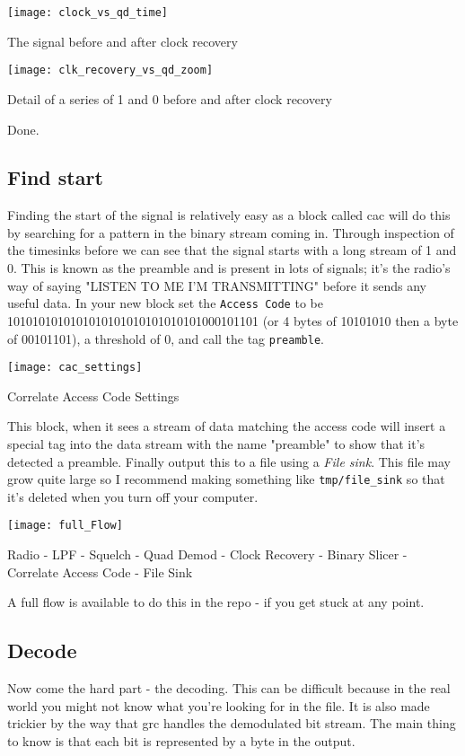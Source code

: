 \centrefigurestart
\texttt{[image: clock\_vs\_qd\_time]}
\caption{The signal before and after clock recovery}
\label{binslice}
\centrefigureend

\centrefigurestart
\texttt{[image: clk\_recovery\_vs\_qd\_zoom]}
\caption{Detail of a series of 1 and 0 before and after clock recovery}
\label{bindetail}
\centrefigureend


Done.

\subsection{Find start}
Finding the start of the signal is relatively easy as a block called \Gls{cac} will do this by searching for a pattern in the binary stream coming in. Through inspection of the \gls{timesink}s before we can see that the signal starts with a long stream of 1 and 0. This is known as the \gls{preamble} and is present in lots of signals; it's the radio's way of saying "LISTEN TO ME I'M TRANSMITTING" before it sends any useful data. In your new block set the \verb|Access Code| to be 1010101010101010101010101010101000101101 (or 4 bytes of 10101010 then a byte of 00101101), a threshold of 0, and call the tag \verb|preamble|.

\centrefigurestart
\texttt{[image: cac\_settings]}
\caption{Correlate Access Code Settings}
\centrefigureend

This block, when it sees a stream of data matching the access code will insert a special tag into the data stream with the name "preamble" to show that it's detected a \gls{preamble}. Finally output this to a file using a \textit{File \Gls{sink}}. This file may grow quite large so I recommend making something like \verb|tmp/file_sink| so that it's deleted when you turn off your computer.

\centrefigurestart
\texttt{[image: full\_Flow]}
\caption{Radio - LPF - Squelch - Quad Demod - Clock Recovery - Binary Slicer - Correlate Access Code - File Sink}
\centrefigureend

A full flow is available to do this in the \gls{repo} - if you get stuck at any point.

\subsection{Decode}
Now come the hard part - the decoding. This can be difficult because in the real world you might not know what you're looking for in the file. It is also made trickier by the way that \gls{grc} handles the demodulated bit stream. The main thing to know is that each bit is represented by a byte in the output. 

